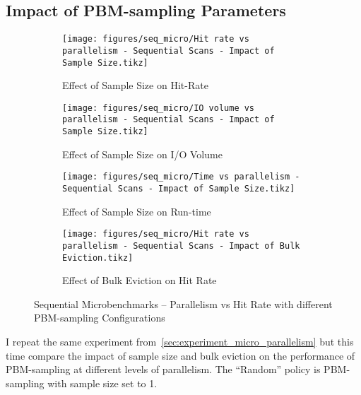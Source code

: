 \subsection{Impact of PBM-sampling Parameters}
\label{sec:eval_sample_size}


\begin{figure}
\centering
    \begin{subfigure}{0.45\textwidth}
        \centering
        \texttt{[image: figures/seq\_micro/Hit rate vs parallelism - Sequential Scans - Impact of Sample Size.tikz]}
        \caption{Effect of Sample Size on Hit-Rate}
        \label{fig:seq_micro_parallel_hitrate_samplesize}
    \end{subfigure}\hspace{0.05\textwidth}%
    \begin{subfigure}{0.45\textwidth}
        \centering
        \texttt{[image: figures/seq\_micro/IO volume vs parallelism - Sequential Scans - Impact of Sample Size.tikz]}
        \caption{Effect of Sample Size on I/O Volume}
        \label{fig:seq_micro_parallel_iovol_samplesize}
    \end{subfigure}
    
\vspace{20pt}
    \begin{subfigure}{0.45\textwidth}
        \centering
        \texttt{[image: figures/seq\_micro/Time vs parallelism - Sequential Scans - Impact of Sample Size.tikz]}
        \caption{Effect of Sample Size on Run-time}
        \label{fig:seq_micro_parallel_time_samplesize}
    \end{subfigure}\hspace{0.05\textwidth}%
    \begin{subfigure}{0.45\textwidth}
        \centering
        \texttt{[image: figures/seq\_micro/Hit rate vs parallelism - Sequential Scans - Impact of Bulk Eviction.tikz]}
        \caption{Effect of Bulk Eviction on Hit Rate}
        \label{fig:seq_micro_parallel_hitrate_bulk}
    \end{subfigure}
    \caption{Sequential Microbenchmarks -- Parallelism vs Hit Rate with different PBM-sampling Configurations}
    \label{fig:seq_micro_parallel_samplingparams}
\end{figure}



I repeat the same experiment from~\ref{sec:experiment_micro_parallelism} but this time compare the impact of sample size and bulk eviction on the performance of PBM-sampling at different levels of parallelism. The ``Random'' policy is PBM-sampling with sample size set to 1.

